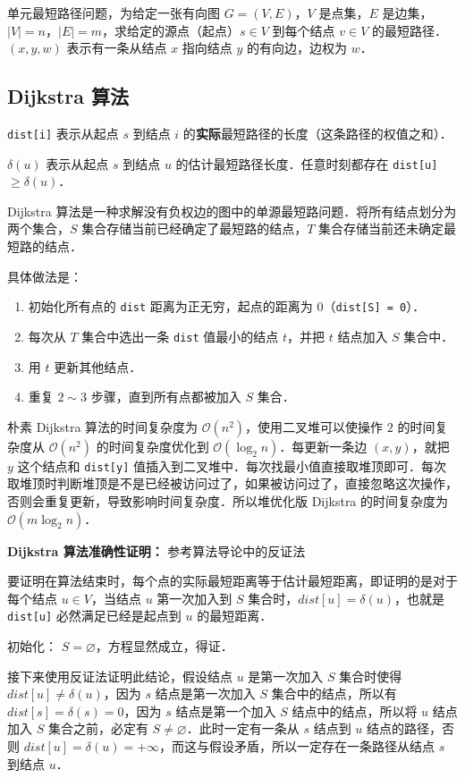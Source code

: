 
单元最短路径问题，为给定一张有向图 $G = (V, E)$，$V$ 是点集，$E$ 是边集，$|V|= n$，$|E| = m$，求给定的源点（起点）$s \in V$ 到每个结点 $v \in V$ 的最短路径．$(x, y, w)$ 表示有一条从结点 $x$ 指向结点 $y$ 的有向边，边权为 $w$．

\subsection{Dijkstra 算法}

\verb|dist[i]| 表示从起点 $s$ 到结点 $i$ 的\textbf{实际}最短路径的长度（这条路径的权值之和）．

$\delta(u)$ 表示从起点 $s$ 到结点 $u$ 的估计最短路径长度．任意时刻都存在 \verb|dist[u]| $\geq \delta(u)$．

Dijkstra 算法是一种求解没有负权边的图中的单源最短路问题．将所有结点划分为两个集合，$S$ 集合存储当前已经确定了最短路的结点，$T$ 集合存储当前还未确定最短路的结点．

具体做法是：
\begin{enumerate}
\item 初始化所有点的 \verb|dist| 距离为正无穷，起点的距离为 $0$（\verb|dist[S] = 0|）．
\item 每次从 $T$ 集合中选出一条 \verb|dist| 值最小的结点 $t$，并把 $t$ 结点加入 $S$ 集合中．
\item 用 $t$ 更新其他结点．
\item 重复 $2 \sim 3$ 步骤，直到所有点都被加入 $S$ 集合．
\end{enumerate}

朴素 Dijkstra 算法的时间复杂度为 $\mathcal{O}(n^2)$，使用二叉堆可以使操作 $2$ 的时间复杂度从 $\mathcal{O}(n^2)$ 的时间复杂度优化到 $\mathcal{O}(\log_2 n)$．每更新一条边 $(x, y)$，就把 $y$ 这个结点和 \verb|dist[y]| 值插入到二叉堆中．每次找最小值直接取堆顶即可．每次取堆顶时判断堆顶是不是已经被访问过了，如果被访问过了，直接忽略这次操作，否则会重复更新，导致影响时间复杂度．所以堆优化版 Dijkstra 的时间复杂度为 $\mathcal{O}(m \log_2 n)$．

\textbf{Dijkstra 算法准确性证明：}
参考算法导论中的反证法

要证明在算法结束时，每个点的实际最短距离等于估计最短距离，即证明的是对于每个结点 $u \in V$，当结点 $u$ 第一次加入到 $S$ 集合时，$dist[u] =\delta(u)$，也就是 \verb|dist[u]| 必然满足已经是起点到 $u$ 的最短距离．

初始化： $S = \varnothing$，方程显然成立，得证．

接下来使用反证法证明此结论，假设结点 $u$ 是第一次加入 $S$ 集合时使得 $dist[u] \neq \delta(u)$，因为 $s$ 结点是第一次加入 $S$ 集合中的结点，所以有 $dist[s] = \delta(s) = 0$，因为 $s$ 结点是第一个加入 $S$ 结点中的结点，所以将 $u$ 结点加入 $S$ 集合之前，必定有 $S \neq \varnothing$．此时一定有一条从 $s$ 结点到 $u$ 结点的路径，否则 $dist[u] = \delta(u) = +\infty$，而这与假设矛盾，所以一定存在一条路径从结点 $s$ 到结点 $u$．

